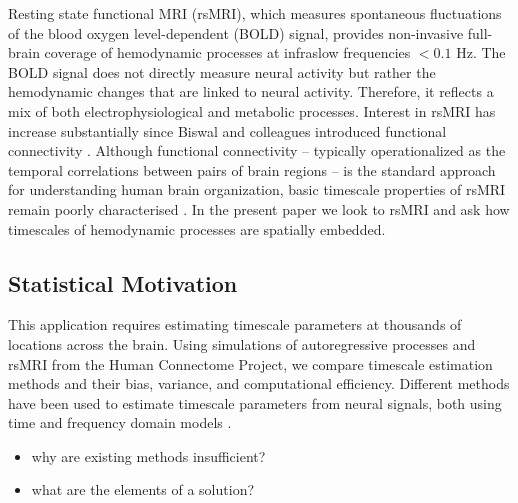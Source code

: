 \documentclass[latex/main.tex]{subfiles}
\begin{document}
Resting state functional MRI (rsMRI), which measures spontaneous fluctuations of the blood oxygen level-dependent (BOLD) signal, provides non-invasive full-brain coverage of hemodynamic processes at infraslow frequencies $<0.1$ Hz. The BOLD signal does not directly measure neural activity but rather the hemodynamic changes that are linked to neural activity. Therefore, it reflects a mix of both electrophysiological and metabolic processes. Interest in rsMRI has increase substantially since Biswal and colleagues introduced functional connectivity \cite{biswal_functional_1995}. Although functional connectivity -- typically operationalized as the temporal correlations between pairs of brain regions -- is the standard approach for understanding human brain organization, basic timescale properties of rsMRI remain poorly characterised \cite{shinn_functional_2023}. In the present paper we look to rsMRI and ask how timescales of hemodynamic processes are spatially embedded.\\

\subsection{Statistical Motivation}
This application requires estimating timescale parameters at thousands of locations across the brain. Using simulations of autoregressive processes and rsMRI from the Human Connectome Project, we compare timescale estimation methods and their bias, variance, and computational efficiency. Different methods have been used to estimate timescale parameters from neural signals, both using time and frequency domain models \cite{gao_neuronal_2020, raut_hierarchical_2020}. 

\begin{itemize}
    \item why are existing methods insufficient?
    \item what are the elements of a solution?
\end{itemize}
\end{document}

